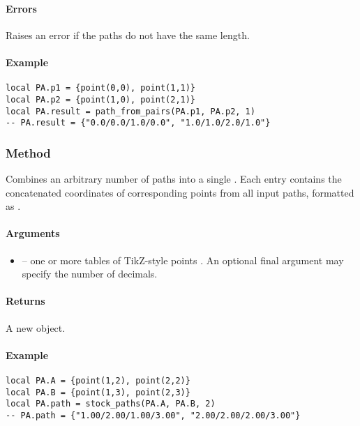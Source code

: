 {\paragraph{Errors} Raises an error if the paths do not have the same length.

\paragraph{Example}
\begin{verbatim}
local PA.p1 = {point(0,0), point(1,1)}
local PA.p2 = {point(1,0), point(2,1)}
local PA.result = path_from_pairs(PA.p1, PA.p2, 1)
-- PA.result = {"0.0/0.0/1.0/0.0", "1.0/1.0/2.0/1.0"}
\end{verbatim}


\subsubsection{Method } %
\label{ssub:method_tkzmeth_path_stock__paths}

Combines an arbitrary number of paths into a single . Each entry contains the concatenated coordinates of corresponding points from all input paths, formatted as .

\paragraph{Arguments}
\begin{itemize}
  \item {} – one or more tables of TikZ-style points . An optional final argument may specify the number of decimals.
\end{itemize}

\paragraph{Returns} A new  object.

\paragraph{Example}
\begin{verbatim}
local PA.A = {point(1,2), point(2,2)}
local PA.B = {point(1,3), point(2,3)}
local PA.path = stock_paths(PA.A, PA.B, 2)
-- PA.path = {"1.00/2.00/1.00/3.00", "2.00/2.00/2.00/3.00"}
\end{verbatim}


}
